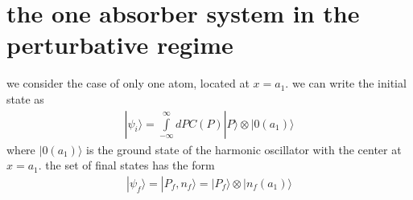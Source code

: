 \section{the one absorber system in the perturbative regime}\label{sec:osc-one-absorber-perturbative}

we consider the case of only one atom, located at $x=a_1$. we can write the initial state as
\begin{align}
  |\psi_i\rangle = \int\limits_{-\infty}^{\infty}dP C(P)|P\rangle\otimes|0(a_1)\rangle
\end{align}
where $|0(a_1)\rangle$ is the ground state of the harmonic oscillator with the center at $x=a_1$.
the set of final states has the form
\begin{align}
  |\psi_f\rangle = |P_f,n_f\rangle = |P_f\rangle\otimes|n_f(a_1)\rangle
\end{align}

